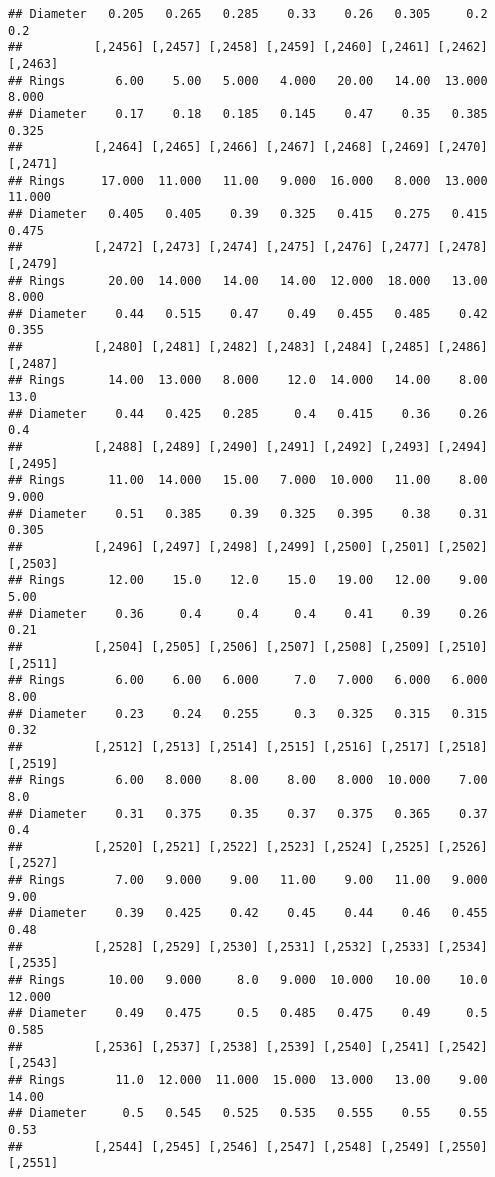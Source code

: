 \documentclass[
]{article}
\begin{document}
\begin{verbatim}
## Diameter   0.205   0.265   0.285    0.33    0.26   0.305     0.2     0.2
##          [,2456] [,2457] [,2458] [,2459] [,2460] [,2461] [,2462] [,2463]
## Rings       6.00    5.00   5.000   4.000   20.00   14.00  13.000   8.000
## Diameter    0.17    0.18   0.185   0.145    0.47    0.35   0.385   0.325
##          [,2464] [,2465] [,2466] [,2467] [,2468] [,2469] [,2470] [,2471]
## Rings     17.000  11.000   11.00   9.000  16.000   8.000  13.000  11.000
## Diameter   0.405   0.405    0.39   0.325   0.415   0.275   0.415   0.475
##          [,2472] [,2473] [,2474] [,2475] [,2476] [,2477] [,2478] [,2479]
## Rings      20.00  14.000   14.00   14.00  12.000  18.000   13.00   8.000
## Diameter    0.44   0.515    0.47    0.49   0.455   0.485    0.42   0.355
##          [,2480] [,2481] [,2482] [,2483] [,2484] [,2485] [,2486] [,2487]
## Rings      14.00  13.000   8.000    12.0  14.000   14.00    8.00    13.0
## Diameter    0.44   0.425   0.285     0.4   0.415    0.36    0.26     0.4
##          [,2488] [,2489] [,2490] [,2491] [,2492] [,2493] [,2494] [,2495]
## Rings      11.00  14.000   15.00   7.000  10.000   11.00    8.00   9.000
## Diameter    0.51   0.385    0.39   0.325   0.395    0.38    0.31   0.305
##          [,2496] [,2497] [,2498] [,2499] [,2500] [,2501] [,2502] [,2503]
## Rings      12.00    15.0    12.0    15.0   19.00   12.00    9.00    5.00
## Diameter    0.36     0.4     0.4     0.4    0.41    0.39    0.26    0.21
##          [,2504] [,2505] [,2506] [,2507] [,2508] [,2509] [,2510] [,2511]
## Rings       6.00    6.00   6.000     7.0   7.000   6.000   6.000    8.00
## Diameter    0.23    0.24   0.255     0.3   0.325   0.315   0.315    0.32
##          [,2512] [,2513] [,2514] [,2515] [,2516] [,2517] [,2518] [,2519]
## Rings       6.00   8.000    8.00    8.00   8.000  10.000    7.00     8.0
## Diameter    0.31   0.375    0.35    0.37   0.375   0.365    0.37     0.4
##          [,2520] [,2521] [,2522] [,2523] [,2524] [,2525] [,2526] [,2527]
## Rings       7.00   9.000    9.00   11.00    9.00   11.00   9.000    9.00
## Diameter    0.39   0.425    0.42    0.45    0.44    0.46   0.455    0.48
##          [,2528] [,2529] [,2530] [,2531] [,2532] [,2533] [,2534] [,2535]
## Rings      10.00   9.000     8.0   9.000  10.000   10.00    10.0  12.000
## Diameter    0.49   0.475     0.5   0.485   0.475    0.49     0.5   0.585
##          [,2536] [,2537] [,2538] [,2539] [,2540] [,2541] [,2542] [,2543]
## Rings       11.0  12.000  11.000  15.000  13.000   13.00    9.00   14.00
## Diameter     0.5   0.545   0.525   0.535   0.555    0.55    0.55    0.53
##          [,2544] [,2545] [,2546] [,2547] [,2548] [,2549] [,2550] [,2551]

\end{verbatim}
\end{document}
